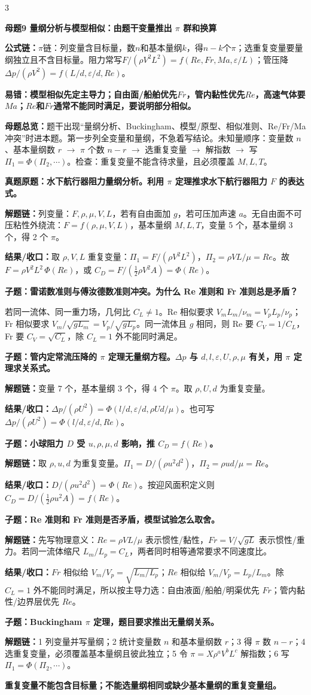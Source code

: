 \documentclass[a4paper]{article}
\newcommand{\mt}[1]{\vspace{0.22pt}\colorbox{M}{\parbox{\dimexpr\linewidth-2\fboxsep}{\color{white}\bfseries #1}}\par}
\newcommand{\qt}[1]{\vspace{0.10pt}\colorbox{Q}{\parbox{\dimexpr\linewidth-2\fboxsep}{\color{white}\bfseries #1}}\par}
\newcommand{\ans}[1]{\colorbox{G}{\parbox{\dimexpr\linewidth-2\fboxsep}{#1}}\par}
\newcommand{\warn}[1]{\colorbox{Y}{\parbox{\dimexpr\linewidth-2\fboxsep}{\color{E}\bfseries #1}}\par}
\newcommand{\chain}[1]{{\color{A}\bfseries 解题链：}#1\par}
\newcommand{\res}[1]{{\color{E}\bfseries 结果/收口：}#1\par}
\newcommand{\form}[1]{{\color{M}\bfseries 公式链：}#1\par}
\newcommand{\mview}[1]{\ans{\textbf{母题总览：}#1}}
\begin{document}
\begin{multicols}{3}
\mt{母题9 量纲分析与模型相似：由题干变量推出 $\pi$ 群和换算}
\form{$\pi$链：列变量含目标量，数$n$和基本量纲$k$，得$n-k$个$\pi$；选重复变量要量纲独立且不含目标量。阻力常写$F/(\rho V^2L^2)=f(Re,Fr,Ma,\varepsilon/L)$；管压降$\Delta p/(\rho V^2)=f(L/d,\varepsilon/d,Re)$。}
\warn{易错：模型相似先定主导力；自由面/船舶优先$Fr$，管内黏性优先$Re$，高速气体要$Ma$；$Re$和$Fr$通常不能同时满足，要说明部分相似。}
\mview{题干出现“量纲分析、Buckingham、模型/原型、相似准则、Re/Fr/Ma 冲突”时进本题。第一步列全变量和量纲，不急着写结论。未知量顺序：变量数 $n$、基本量纲数 $r$ $\to$ $\pi$ 个数 $n-r$ $\to$ 选重复变量 $\to$ 解指数 $\to$ 写 $\Pi_1=\Phi(\Pi_2,\cdots)$。检查：重复变量不能含待求量，且必须覆盖 $M,L,T$。}
\qt{真题原题：水下航行器阻力量纲分析。利用 $\pi$ 定理推求水下航行器阻力 $F$ 的表达式。}
\chain{列变量：$F,\rho,\mu,V,L$，若有自由面加 $g$，若可压加声速 $a$。无自由面不可压粘性外绕流：$F=f(\rho,\mu,V,L)$，基本量纲 $M,L,T$，变量 5 个，基本量纲 3 个，得 2 个 $\pi$。}
\res{取 $\rho,V,L$ 重复变量：$\Pi_1=F/(\rho V^2L^2)$，$\Pi_2=\rho VL/\mu=Re$。故 $F=\rho V^2L^2\,\Phi(Re)$，或 $C_D=F/(\frac12\rho V^2A)=\Phi(Re)$。}

\qt{子题：雷诺数准则与傅汝德数准则冲突。为什么 Re 准则和 Fr 准则总是矛盾？}
\ans{若同一流体、同一重力场，几何比 $C_L\ne1$。Re 相似要求 $V_mL_m/\nu_m=V_pL_p/\nu_p$；Fr 相似要求 $V_m/\sqrt{gL_m}=V_p/\sqrt{gL_p}$。同一流体且 $g$ 相同，则 Re 要 $C_V=1/C_L$，Fr 要 $C_V=\sqrt{C_L}$，除 $C_L=1$ 外不能同时满足。}

\qt{子题：管内定常流压降的 $\pi$ 定理无量纲方程。$\Delta p$ 与 $d,l,\varepsilon,U,\rho,\mu$ 有关，用 $\pi$ 定理求关系式。}
\chain{变量 7 个，基本量纲 3 个，得 4 个 $\pi$。取 $\rho,U,d$ 为重复变量。}
\res{$\Delta p/(\rho U^2)=\Phi(l/d,\varepsilon/d,\rho Ud/\mu)$。也可写 $\Delta p/(\rho U^2)=\Phi(l/d,\varepsilon/d,Re)$。}

\qt{子题：小球阻力 $D$ 受 $u,\rho,\mu,d$ 影响，推 $C_D=f(Re)$。}
\chain{取 $\rho,u,d$ 为重复变量。$\Pi_1=D/(\rho u^2d^2)$，$\Pi_2=\rho ud/\mu=Re$。}
\res{$D/(\rho u^2d^2)=\Phi(Re)$。按迎风面积定义则 $C_D=D/(\frac12\rho u^2A)=f(Re)$。}

\qt{子题：Re 准则和 Fr 准则是否矛盾，模型试验怎么取舍。}
\chain{先写物理意义：$Re=\rho VL/\mu$ 表示惯性/黏性，$Fr=V/\sqrt{gL}$ 表示惯性/重力。若同一流体缩尺 $L_m/L_p=C_L$，两者同时相等通常要求不同速度比。}
\res{$Fr$ 相似给 $V_m/V_p=\sqrt{L_m/L_p}$；$Re$ 相似给 $V_m/V_p=L_p/L_m$。除 $C_L=1$ 外不能同时满足，所以按主导力选：自由液面/船舶/明渠优先 $Fr$；管内黏性/边界层优先 $Re$。}

\qt{子题：Buckingham $\pi$ 定理，题目要求推出无量纲关系。}
\chain{1 列变量并写量纲；2 统计变量数 $n$ 和基本量纲数 $r$；3 得 $\pi$ 数 $n-r$；4 选重复变量，必须覆盖基本量纲且彼此独立；5 令 $\pi=X\rho^aV^bL^c$ 解指数；6 写 $\Pi_1=\Phi(\Pi_2,\cdots)$。}
\warn{重复变量不能包含目标量；不能选量纲相同或缺少基本量纲的重复变量组。}


\end{multicols}
\end{document}
